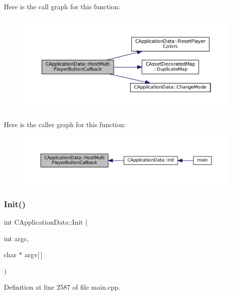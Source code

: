 Here is the call graph for this function\+:\nopagebreak
\begin{figure}[H]
\begin{center}
\leavevmode
\includegraphics[width=350pt]{classCApplicationData_a9f804f7f34e1f0abf8c395cd0032d811_cgraph}
\end{center}
\end{figure}
Here is the caller graph for this function\+:\nopagebreak
\begin{figure}[H]
\begin{center}
\leavevmode
\includegraphics[width=350pt]{classCApplicationData_a9f804f7f34e1f0abf8c395cd0032d811_icgraph}
\end{center}
\end{figure}
\hypertarget{classCApplicationData_ab757e7ad037decb18cefa3f4ad2e1298}{}\label{classCApplicationData_ab757e7ad037decb18cefa3f4ad2e1298} 
\subsubsection{\texorpdfstring{Init()}{Init()}}
{\footnotesize\ttfamily int C\+Application\+Data\+::\+Init (\begin{DoxyParamCaption}\item[{int}]{argc,  }\item[{char $\ast$}]{argv\mbox{[}$\,$\mbox{]} }\end{DoxyParamCaption})}



Definition at line 2587 of file main.\+cpp.


